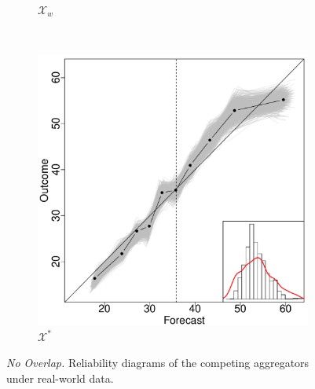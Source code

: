 \documentclass[11pt]{article}
\theoremstyle{definition}
\theoremstyle{definition}
\begin{document}
\begin{figure}
\begin{subfigure}[b]{0.323\textwidth}
                \caption{$\mathcal{X}_w$}
                \label{fig:gull}
        \end{subfigure}%
        ~ %
        ~ %
        \begin{subfigure}[b]{0.323\textwidth}
                \includegraphics[width=\textwidth]{IndependentE-OLP}
                \caption{$\mathcal{X}^*$}
                \label{RelDiagramNoE}
             \end{subfigure}

        
        
        
        \caption{\textit{No Overlap.} Reliability diagrams of the competing aggregators  under real-world data.}
        
        
                \label{RelDiagramNo}
\end{figure}
\end{document}
